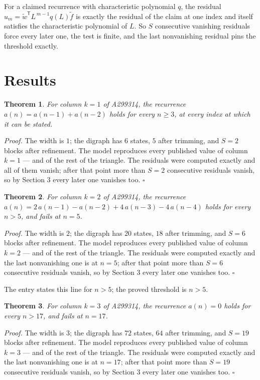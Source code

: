 \documentclass[11pt]{article}
\newtheorem{theorem}{Theorem}
\theoremstyle{definition}
\begin{document}
For a claimed recurrence with characteristic polynomial $q$, the residual $u_m = \tilde w^{\mathsf T}L^{\,m-1}q(L)\tilde f$ is exactly the residual of the claim at one index and itself satisfies the characteristic polynomial of $L$. So $S$ consecutive vanishing residuals force every later one, the test is finite, and the last nonvanishing residual pins the threshold exactly.

\section{Results}

\begin{theorem} For column $k = 1$ of A299314, the recurrence $a(n) = a(n-1) + a(n-2)$ holds for every $n \ge 3$, at every index at which it can be stated.\end{theorem}

{\itshape Proof.} The width is $1$; the digraph has $6$ states, $5$ after trimming, and $S = 2$ blocks after refinement. The model reproduces every published value of column $k = 1$ --- and of the rest of the triangle. The residuals were computed exactly and all of them vanish; after that point more than $S = 2$ consecutive residuals vanish, so by Section 3 every later one vanishes too. $\square$

\begin{theorem} For column $k = 2$ of A299314, the recurrence $a(n) = 2\,a(n-1) - a(n-2) + 4\,a(n-3) - 4\,a(n-4)$ holds for every $n > 5$, and fails at $n = 5$.\end{theorem}

{\itshape Proof.} The width is $2$; the digraph has $20$ states, $18$ after trimming, and $S = 6$ blocks after refinement. The model reproduces every published value of column $k = 2$ --- and of the rest of the triangle. The residuals were computed exactly and the last nonvanishing one is at $n = 5$; after that point more than $S = 6$ consecutive residuals vanish, so by Section 3 every later one vanishes too. $\square$

The entry states this line for $n > 5$; the proved threshold is $n > 5$.

\begin{theorem} For column $k = 3$ of A299314, the recurrence $a(n) = 0$ holds for every $n > 17$, and fails at $n = 17$.\end{theorem}

{\itshape Proof.} The width is $3$; the digraph has $72$ states, $64$ after trimming, and $S = 19$ blocks after refinement. The model reproduces every published value of column $k = 3$ --- and of the rest of the triangle. The residuals were computed exactly and the last nonvanishing one is at $n = 17$; after that point more than $S = 19$ consecutive residuals vanish, so by Section 3 every later one vanishes too. $\square$
\end{document}
